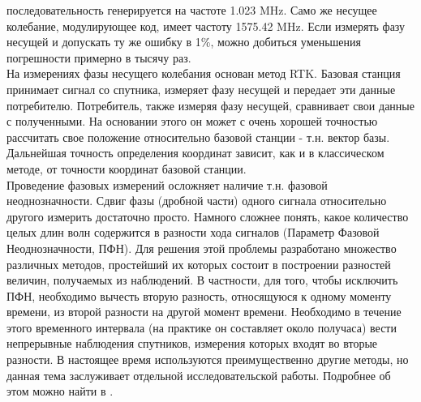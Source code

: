 \documentclass[a4paper,12pt]{report}
\begin{document}
последовательность генерируется на частоте 1.023 MHz. Само же несущее колебание, модулирующее код, имеет частоту 1575.42 MHz. Если измерять 
фазу несущей и допускать ту же ошибку в 1\%, можно добиться уменьшения погрешности примерно в тысячу раз. \\
На измерениях фазы несущего колебания основан метод RTK. Базовая станция принимает сигнал со спутника, измеряет фазу несущей и передает эти 
данные потребителю. Потребитель, также измеряя фазу несущей, сравнивает свои данные с полученными. На основании этого он может с очень хорошей 
точностью рассчитать свое положение относительно базовой станции - т.н. вектор базы. Дальнейшая точность определения координат зависит, как и 
в классическом методе, от точности координат базовой станции. \\
Проведение фазовых измерений осложняет наличие т.н. фазовой неоднозначности. Сдвиг фазы (дробной части) одного сигнала относительно другого 
измерить достаточно просто. Намного сложнее понять, какое количество целых длин волн содержится в разности хода сигналов (Параметр Фазовой 
Неоднозначности, ПФН). Для решения этой проблемы разработано множество различных методов, простейший их которых состоит в построении разностей 
величин, получаемых из наблюдений. В частности, для того, чтобы исключить ПФН, необходимо вычесть вторую разность, относящуюся к одному моменту 
времени, из второй разности на другой момент времени. Необходимо в течение этого временного интервала (на практике он составляет около 
получаса) вести непрерывные наблюдения спутников, измерения которых входят во вторые разности. В настоящее время используются 
преимущественно другие методы, но данная тема заслуживает отдельной исследовательской работы. Подробнее об этом можно найти в \cite{karut}. \\
\end{document}
